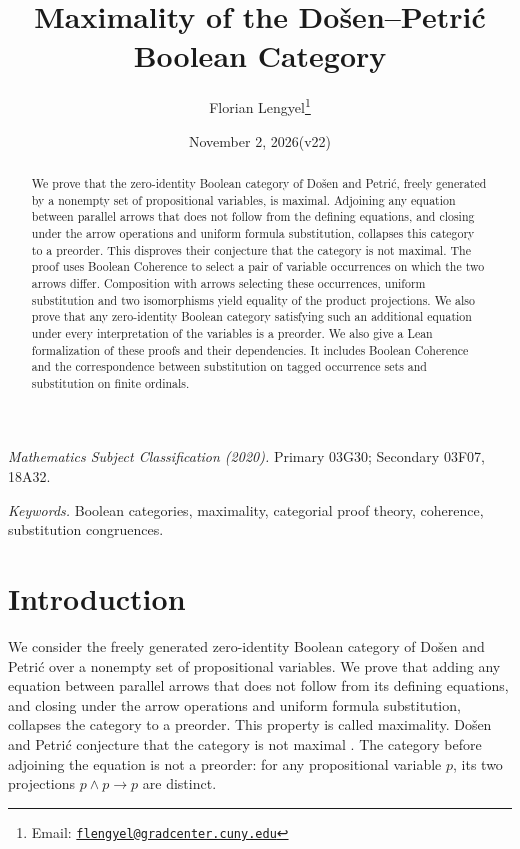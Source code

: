 \documentclass[11pt]{article}
\title{Maximality of the Do\v{s}en--Petri\'c Boolean Category}
\author{Florian Lengyel\thanks{Email: \href{mailto:flengyel@gradcenter.cuny.edu}{\texttt{flengyel@gradcenter.cuny.edu}}}}
\date{November 2, 2026\quad(v22)}
\begin{document}
\maketitle

\begin{abstract}
We prove that the zero-identity Boolean category of Do\v{s}en and
Petri\'c, freely generated by a nonempty set of propositional
variables, is maximal. Adjoining any equation between parallel arrows that does not follow
from the defining equations, and closing under the arrow operations
and uniform formula substitution, collapses this category to a preorder.
This disproves their conjecture that the category is not maximal.
The proof uses Boolean Coherence to select a pair of variable
occurrences on which the two arrows differ. Composition with arrows
selecting these occurrences, uniform substitution and two
isomorphisms yield equality of the product projections. We also
prove that any zero-identity Boolean category satisfying such an
additional equation under every interpretation of the variables is
a preorder. We also give a Lean formalization of these proofs and
their dependencies. It includes Boolean Coherence and the
correspondence between substitution on tagged occurrence sets and
substitution on finite ordinals.
\end{abstract}

\medskip
\noindent\textit{Mathematics Subject Classification (2020).}
Primary 03G30; Secondary 03F07, 18A32.

\smallskip
\noindent\textit{Keywords.} Boolean categories, maximality, categorial proof theory,
coherence, substitution congruences.

\section{Introduction}

We consider the freely generated zero-identity Boolean category of
Do\v{s}en and Petri\'c over a nonempty set of propositional variables.
We prove that adding any equation between parallel arrows that does
not follow from its defining equations, and closing under the arrow
operations and uniform formula substitution, collapses the category
to a preorder. This property is called maximality. Do\v{s}en and
Petri\'c conjecture that the category is not maximal
\cite[\S14.2, p.~322]{DP}. The category before adjoining the
equation is not a preorder: for any propositional variable $p$, its
two projections $p\wedge p\to p$ are distinct.
\end{document}
